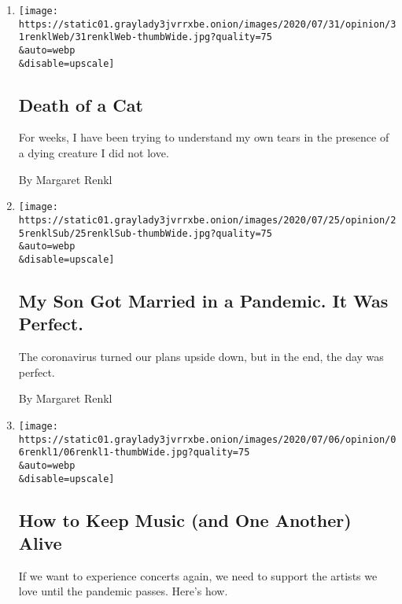 \begin{enumerate}
\def\labelenumi{\arabic{enumi}.}
\item
  \href{/2020/08/03/opinion/feral-cat-dying.html}{}

  \texttt{[image: https://static01.graylady3jvrrxbe.onion/images/2020/07/31/opinion/31renklWeb/31renklWeb-thumbWide.jpg?quality=75\\\&auto=webp\\\&disable=upscale]}

  \hypertarget{death-of-a-cat}{%
  \subsection{Death of a Cat}\label{death-of-a-cat}}

  For weeks, I have been trying to understand my own tears in the
  presence of a dying creature I did not love.

  By Margaret Renkl
\item
  \href{/2020/07/26/opinion/coronavirus-wedding.html}{}

  \texttt{[image: https://static01.graylady3jvrrxbe.onion/images/2020/07/25/opinion/25renklSub/25renklSub-thumbWide.jpg?quality=75\\\&auto=webp\\\&disable=upscale]}

  \hypertarget{my-son-got-married-in-a-pandemic-it-was-perfect}{%
  \subsection{My Son Got Married in a Pandemic. It Was
  Perfect.}\label{my-son-got-married-in-a-pandemic-it-was-perfect}}

  The coronavirus turned our plans upside down, but in the end, the day
  was perfect.

  By Margaret Renkl
\item
  \href{/2020/07/05/opinion/coronavirus-chase-rice-country-music.html}{}

  \texttt{[image: https://static01.graylady3jvrrxbe.onion/images/2020/07/06/opinion/06renkl1/06renkl1-thumbWide.jpg?quality=75\\\&auto=webp\\\&disable=upscale]}

  \hypertarget{how-to-keep-music-and-one-another-alive}{%
  \subsection{How to Keep Music (and One Another)
  Alive}\label{how-to-keep-music-and-one-another-alive}}

  If we want to experience concerts again, we need to support the
  artists we love until the pandemic passes. Here's how.


\end{enumerate}
